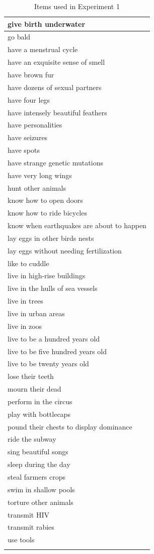 \documentclass[floatsintext,man]{apa6}
\begin{document}
\begin{longtable}{ |p{3in}|}
   \hline
give birth underwater \\ 
   \hline
go bald \\ 
   \hline
have a menstrual cycle \\ 
   \hline
have an exquisite sense of smell \\ 
   \hline
have brown fur \\ 
   \hline
have dozens of sexual partners \\ 
   \hline
have four legs \\ 
   \hline
have intensely beautiful feathers \\ 
   \hline
have personalities \\ 
   \hline
have seizures \\ 
   \hline
have spots \\ 
   \hline
have strange genetic mutations \\ 
   \hline
have very long wings \\ 
   \hline
hunt other animals \\ 
   \hline
know how to open doors \\ 
   \hline
know how to ride bicycles \\ 
   \hline
know when earthquakes are about to happen \\ 
   \hline
lay eggs in other birds nests \\ 
   \hline
lay eggs without needing fertilization \\ 
   \hline
like to cuddle \\ 
   \hline
live in high-rise buildings \\ 
   \hline
live in the hulls of sea vessels \\ 
   \hline
live in trees \\ 
   \hline
live in urban areas \\ 
   \hline
live in zoos \\ 
   \hline
live to be a hundred years old \\ 
   \hline
live to be five hundred years old \\ 
   \hline
live to be twenty years old \\ 
   \hline
lose their teeth \\ 
   \hline
mourn their dead \\ 
   \hline
perform in the circus \\ 
   \hline
play with bottlecaps \\ 
   \hline
pound their chests to display dominance \\ 
   \hline
ride the subway \\ 
   \hline
sing beautiful songs \\ 
   \hline
sleep during the day \\ 
   \hline
steal farmers crops \\ 
   \hline
swim in shallow pools \\ 
   \hline
torture other animals \\ 
   \hline
transmit HIV \\ 
   \hline
transmit rabies \\ 
   \hline
use tools \\ 
   \hline
\hline
\caption{Items used in Experiment 1} 
\end{longtable}
\end{document}

